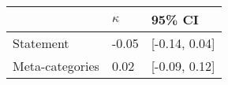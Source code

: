 \begin{tabular}{lll}
\hline
 & $\kappa$ & 95\% CI  \\
\hline
Statement & -0.05 & [-0.14, 0.04] \\
Meta-categories & 0.02 & [-0.09, 0.12] \\
\hline
\end{tabular}
